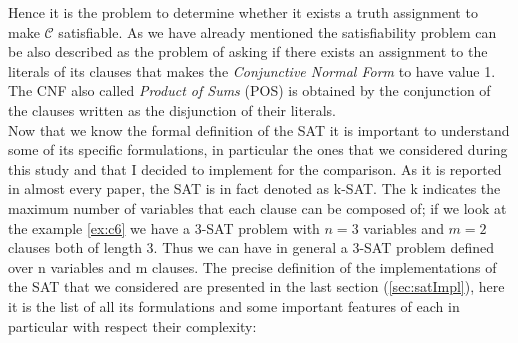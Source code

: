 \documentclass[english]{article}
\begin{document}
			Hence it is the problem to determine whether it exists a truth assignment to make $\mathcal{C}$ satisfiable. As we have already mentioned the satisfiability problem can be also described as the problem of asking if there exists an assignment to the literals of its clauses that makes the \emph{Conjunctive Normal Form} to have value 1. The CNF also called \emph{Product of Sums} (POS) is obtained by the conjunction of the clauses written as the disjunction of their literals. \\
			
			Now that we know the formal definition of the SAT it is important to understand some of its specific formulations, in particular the ones that we considered during this study and that I decided to implement for the comparison. As it is reported in almost every paper, the SAT is in fact denoted as k-SAT. The k indicates the maximum number of variables that each clause can be composed of; if we look at the example \ref{ex:c6} we have a 3-SAT problem with $n = 3$ variables and $m=2$ clauses both of length 3. Thus we can have in general a 3-SAT problem defined over n variables and m clauses. The precise definition of the implementations of the SAT that we considered are presented in the last section (\ref{sec:satImpl}), here it is the list of all its formulations and some important features of each in particular with respect their complexity:
			
\end{document}
